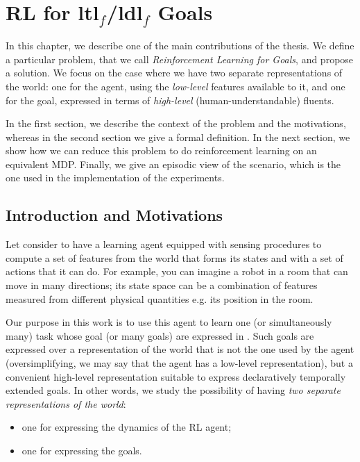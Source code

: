 \chapter{RL for {\sc ltl}$_f$/{\sc ldl}$_f$ Goals}\label{ch:rl-llf-goals}

In this chapter, we describe one of the main contributions of the thesis. We define a particular problem, that we call
\emph{Reinforcement Learning for \LLf Goals}, and propose a solution.
We focus on the case where we have two separate representations of the world: one for the agent, using the \emph{low-level} features available to it, and one for the goal, expressed in terms of \emph{high-level} (human-understandable) fluents.

In the first section, we describe the context of the problem and the motivations, whereas in the second section we give a formal definition. In the next section, we show how we can reduce this problem to do reinforcement learning on an equivalent MDP. Finally, we give an episodic view of the scenario, which is the one used in the implementation of the experiments.

\section{Introduction and Motivations}
Let consider to have a
learning agent equipped with sensing procedures to compute
a set of features from the world that forms its states and with
a set of actions that it can do. 
For example, you can imagine a robot in a room that can move in many directions; its state space can be a combination of features measured from different physical quantities e.g. its position in the room.

Our purpose in this work is to use this agent
to learn one (or simultaneously many) task whose goal (or many goals)
are expressed in \LLf. Such goals are expressed over
a representation of the world that is not the one used by the
agent (oversimplifying, we may say that the agent has a low-level representation), but a convenient high-level representation suitable to express declaratively temporally extended goals. In other words, we study the possibility of having \emph{two
separate representations of the world}:
\begin{itemize}
	\item one for expressing the dynamics of the RL agent;
	\item one for expressing the \LLf goals.
\end{itemize}

